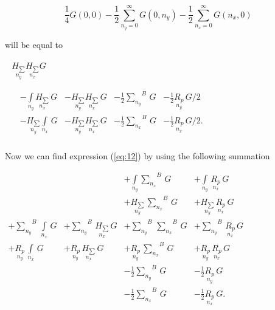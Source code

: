 \documentclass[twoside, 10pt, ptm]{article}
\begin{document}
\begin{multicols}{2}
    

    \[
\frac{1}{4}G\left(0, 0\right)
- \frac{1}{2}\sum\limits_{n_y=0}^{\infty}{G\left(0, n_y\right)}
- \frac{1}{2}\sum\limits_{n_x=0}^{\infty}{G\left(n_x, 0\right)}
\]

    will be equal to

\noindent
\(\begin{array}{l}
    \begin{array}{l}
  \underset{n_y}{H_{\sum}} \underset{n_x}{H_{\sum}} G \\
\end{array} \\
\begin{array}{rrrrr}
  \, &  - \int\limits_{n_y}^{} \underset{n_x}{H_{\sum}}\,G &  - \underset{n_y}{H_{\sum}} \underset{n_x}{H_{\sum}}\,G &  - \frac{1}{2}{\sum\limits_{n_y}^{}}^{B}\,G &  - \frac{1}{2}\underset{n_y}{R_{p}}\,G/2 \\
  \,&  - \underset{n_y}{H_{\sum}}\int\limits_{n_x}^{} \,G &  - \underset{n_y}{H_{\sum}} \underset{n_x}{H_{\sum}}\,G &  - \frac{1}{2}{\sum\limits_{n_x}^{}}^{B}\,G &  - \frac{1}{2}\underset{n_x}{R_{p}}\,G/2. \\
\end{array}
\end{array}\)

    Now we can find expression (\ref{eq:12}) by using the following summation




\noindent
    \(\begin{array}{llll}  \,&  \,&  + \int\limits_{n_y}^{}{\sum\limits_{n_x}^{}}^{B}\,G &  + \int\limits_{n_y}^{}\,\underset{n_x}{R_{p}}\,G \\  \,&  \,&  + \underset{n_y}{H_{\sum}}\,{\sum\limits_{n_x}^{}}^{B}\,G &  + \underset{n_y}{H_{\sum}}\,\underset{n_x}{R_{p}}\,G \\  + {\sum\limits_{n_y}^{}}^{B}\,\int\limits_{n_x}^{}\,G &  + {\sum\limits_{n_y}^{}}^{B}\,\underset{n_x}{H_{\sum}}\,G &  + {\sum\limits_{n_y}^{}}^{B}\,{\sum\limits_{n_x}^{}}^{B}\,G &  + {\sum\limits_{n_y}^{}}^{B}\,\underset{n_x}{R_{p}}\,G \\  + \underset{n_y}{R_{p}}\,\int\limits_{n_x}^{}\,G &  + \underset{n_y}{R_{p}}\,\underset{n_x}{H_{\sum}}\,G &  + \underset{n_y}{R_{p}}\,{\sum\limits_{n_x}^{}}^{B}\,G &  + \underset{n_y}{R_{p}}\,\underset{n_x}{R_{p}}\,G \\  \,&  \,&  - \frac{1}{2}{\sum\limits_{n_y}^{}}^{B}\,G &  - \frac{1}{2}\underset{n_y}{R_{p}}\,G \\  \,&  \,&  - \frac{1}{2}{\sum\limits_{n_x}^{}}^{B}\,G &  - \frac{1}{2}\underset{n_x}{R_{p}}\,G. \\ \end{array}\)


\end{multicols}
\end{document}
